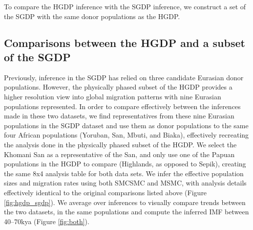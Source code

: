 To compare the HGDP inference with the SGDP inference, we construct a set of the SGDP with the same donor populations as the HGDP.






\subsection{Comparisons between the HGDP and a subset of the SGDP}

Previously, inference in the SGDP has relied on three candidate Eurasian donor populations. However, the physically phased subset of the HGDP provides a higher resolution view into global migration patterns with nine Eurasian populations represented. In order to compare effectively between the inferences made in these two datasets, we find representatives from these nine Eurasian populations in the SGDP dataset and use them as donor populations to the same four African populations (Yoruban, San, Mbuti, and Biaka), effectively recreating the analysis done in the physically phased subset of the HGDP. We select the Khomani San as a representative of the San, and only use one of the Papuan populations in the HGDP to compare (Highlands, as opposed to Sepik), creating the same 8x4 analysis table for both data sets. We infer the effective population sizes and migration rates using both SMCSMC and MSMC, with analysis details effectively identical to the original comparisons listed above (Figure \ref{fig:hgdp_sgdp}). We average over inferences to visually compare trends between the two datasets, in the same populations and compute the inferred IMF between 40--70kya (Figure \ref{fig:both}).  

